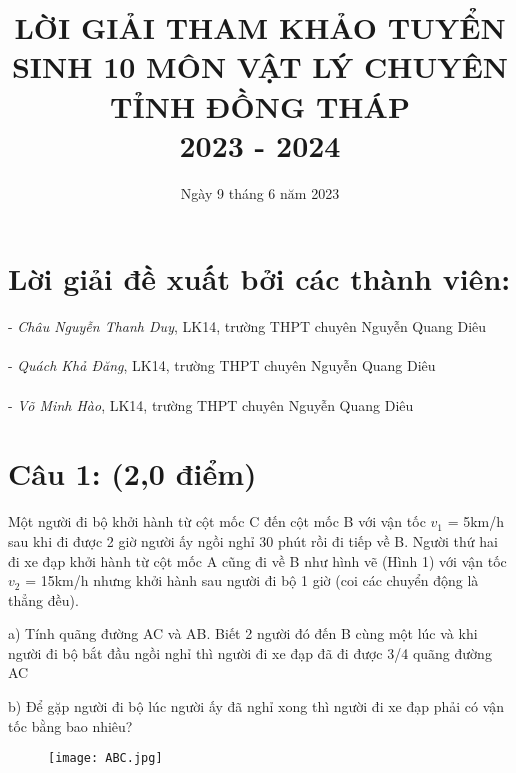 \documentclass[50pt]{article}
\title{\textbf{\color[HTML]{326fbf}LỜI GIẢI THAM KHẢO TUYỂN SINH 10 MÔN VẬT LÝ CHUYÊN TỈNH ĐỒNG THÁP\\ 2023 - 2024}}
\date{Ngày 9 tháng 6 năm 2023}
\begin{document}
\maketitle

\section*{\color[HTML]{4287f5}Lời giải đề xuất bởi các thành viên:}
- \textit{Châu Nguyễn Thanh Duy}, LK14, trường THPT chuyên Nguyễn Quang Diêu\\
\\
- \textit{Quách Khả Đăng}, LK14, trường THPT chuyên Nguyễn Quang Diêu\\
\\
- \textit{Võ Minh Hào}, LK14, trường THPT chuyên Nguyễn Quang Diêu\\
\hline
\section*{\color[HTML]{4287f5}Câu 1: (2,0 điểm)}
Một người đi bộ khởi hành từ cột mốc C đến cột mốc B với vận tốc $v_{1}$ = 5km/h sau khi đi được 2 giờ người ấy ngồi nghỉ 30 phút rồi đi tiếp về B. Người thứ hai đi xe đạp khởi hành từ cột mốc A cũng đi về B như hình vẽ (Hình 1) với vận tốc $v_{2}$ = 15km/h nhưng khởi hành sau người đi bộ 1 giờ (coi các chuyển động là thẳng đều).

a) Tính quãng đường AC và AB. Biết 2 người đó đến B cùng một lúc và khi người đi bộ bắt đầu ngồi nghỉ thì người đi xe đạp đã đi được 3/4 quãng đường AC

b) Để gặp người đi bộ lúc người ấy đã nghỉ xong thì người đi xe đạp phải có vận tốc bằng bao nhiêu?
\begin{figure}[H]
    \centering
    \texttt{[image: ABC.jpg]}
    \label{fig:enter-label}
\end{figure}
\end{document}

